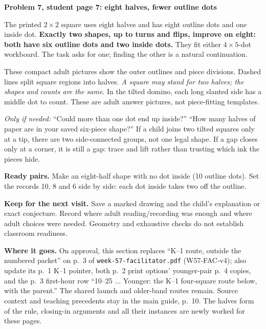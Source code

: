 \documentclass[11pt]{article}
\newcommand{\sub}[1]{\par\textbf{#1}\par}
\newcommand{\hint}[1]{\textit{Only if needed:} #1}
\newcommand{\dotgrid}[2]{\foreach \x in {0,...,#1}{\foreach \y in {0,...,#2}{\fill (\x,\y) circle (1.25pt);}}}
\begin{document}
\sub{Problem 7, student page 7: eight halves, fewer outline dots}
The printed $2\times2$ square uses eight halves and has eight outline dots and one inside dot. \textbf{Exactly two shapes, up to turns and flips, improve on eight: both have six outline dots and two inside dots.} They fit either $4\times5$-dot workboard. The task asks for one; finding the other is a natural continuation.
\begin{center}
\end{center}
These compact adult pictures show the outer outlines and piece divisions. Dashed lines split square regions into halves. \emph{A square may stand for two halves; the shapes and counts are the same}. In the tilted domino, each long slanted side has a middle dot to count. These are adult answer pictures, not piece-fitting templates.

\hint{``Could more than one dot end up inside?'' ``How many halves of paper are in your saved six-piece shape?''} If a child joins two tilted squares only at a tip, there are two side-connected groups, not one legal shape. If a gap closes only at a corner, it is still a gap: trace and lift rather than trusting which ink the pieces hide.

\textbf{Ready pairs.} Make an eight-half shape with no dot inside (10 outline dots). Set the records 10, 8 and 6 side by side: each dot inside takes two off the outline.

\textbf{Keep for the next visit.} Save a marked drawing and the child's explanation or exact conjecture. Record where adult reading/recording was enough and where adult choices were needed. Geometry and exhaustive checks do not establish classroom readiness.

\textbf{Where it goes.} On approval, this section replaces ``K--1 route, outside the numbered packet'' on p.~3 of \texttt{week-57-facilitator.pdf} (W57-FAC-v4); also update its p.~1 K--1 pointer, both p.~2 print options' younger-pair p.~4 copies, and the p.~3 first-hour row ``10--25 ... Younger: the K--1 four-square route below, with the parent.'' The shared launch and older-band routes remain. Source context and teaching precedents stay in the main guide, p.~10. The halves form of the rule, closing-in arguments and all their instances are newly worked for these pages.
\end{document}
